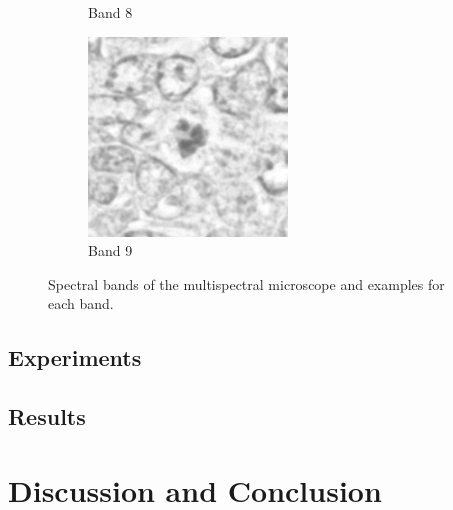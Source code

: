 \documentclass[10pt,twocolumn,letterpaper]{article}
\begin{document}
\begin{figure}[t]
\begin{subfigure}[b]{0.11\textwidth}
		\caption*{Band 8}
	\end{subfigure}
	\begin{subfigure}[b]{0.11\textwidth}
		\centering
		\includegraphics[width=\textwidth]{img/M03_00a_0908_m1.png}
		\caption*{Band 9}
	\end{subfigure}
	\caption{Spectral bands of the multispectral microscope and examples for each band.}
	\label{fig:spectral_bands}
\end{figure}

\subsection{Experiments}

\subsection{Results}

\section{Discussion and Conclusion}

{\small


}
\end{document}
